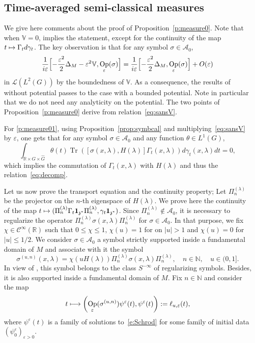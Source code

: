 \documentclass[10pt]{amsart}
\let\mathcal\mathscr
\newcommand\mto{\mathchoice{\longmapsto}{\mapsto}{\mapsto}{\mapsto}}
\newcommand{\bun}{\mathbf{1}}
\DeclareMathOperator{\Op}{Op}
\DeclareMathOperator{\Tr}{Tr}
\theoremstyle{plain}
\theoremstyle{definition}
\let\eps\varepsilon
\def\R{{\mathbb R}}
\def\N{{\mathbb N}}
\def\bbV{{\mathbb V}}
\begin{document}
\subsection{Time-averaged semi-classical measures}
\label{app:semiclas}

We give here comments about the proof of Proposition~\ref{p:measure0}. Note that when $\bbV=0$, \cite[Th.\,2.10(ii)(2)]{FF} implies the statement, except for the continuity of the map $t\mto \Gamma_t d\gamma_t$. The key observation is that for any symbol $\sigma\in\mathcal A_0$,
\begin{equation}\label{eq:sansV}
\frac 1{i\eps} \Bigl[ -\frac{\eps^2}{2}\Delta_M -\eps^2 \bbV, \Op_\eps(\sigma)\Bigr] = \frac 1{i\eps} \Bigl[ -\frac{\eps^2}{2}\Delta_M, \Op_\eps(\sigma)\Bigr] + O(\eps)
\end{equation}
in ${\mathcal L}(L^2(G))$ by the boundedness of $\bbV$. As a consequence, the results of \cite[Th.\,2.10(ii)(2)]{FF} without potential passes to the case with a bounded potential. Note in particular that we do not need any analyticity on the potential.
The two points of Proposition~\ref{p:measure0} derive from relation~\eqref{eq:sansV}.

For \eqref{p:measure01}, using Proposition~\ref{prop:symbcal} and multiplying~\eqref{eq:sansV} by $\eps$, one gets that for any symbol $\sigma\in\mathcal A_0$ and any function $\theta\in L^1(G)$,
\[
\int_{\R\times G \times \hat G} \theta(t) \Tr ([\sigma(x,\lambda),H(\lambda)] \Gamma_t(x,\lambda)) d\gamma_t(x,\lambda) dt=0,
\]
which implies the commutation of $\Gamma_t(x,\lambda)$ with $H(\lambda)$ and thus the relation~\ref{eq:decomp}.

Let us now prove the transport equation and the continuity property;
Let $\Pi_n^{(\lambda)}$ be the projector on the $n$-th eigenspace of $H(\lambda)$.
We prove here the continuity of the map $t\mto (\Pi_n^{(\lambda)}\Gamma_t \bun_{\mathfrak z^*}\Pi_n^{(\lambda)},\gamma_t \bun_{\mathfrak z^*})$. Since $\Pi_n^{(\lambda)}\notin{\mathcal A}_0$, it is necessary to regularize the operator $\Pi_n^{(\lambda)} \sigma(x,\lambda)\Pi_n^{(\lambda)}$ for $\sigma\in\mathcal{A}_0$.
In that purpose, we fix $\chi\in{\mathcal C}^\infty(\R)$ such that $0\leq \chi\leq 1$, $\chi(u)=1$ for on $|u|>1$ and $\chi(u)=0$ for $|u|\leq 1/2$. We consider $\sigma\in {{\mathcal A}_0}$ a symbol strictly supported inside a fundamental domain of $M$ and associate with it the symbol
\[
\sigma^{(u,n)}(x,\lambda)= \chi(uH(\lambda)) \Pi_n^{(\lambda)} \sigma(x,\lambda)\Pi_n^{(\lambda)},\quad n\in\N,\quad u\in (0,1].
\]
In view of \cite[Cor.\,3.9]{FF}, this symbol belongs to the class $S^{-\infty}$ of regularizing symbols. Besides, it is also supported inside a fundamental domain of $M$.
Fix $n\in\N$ and consider the map
\[
t\mto \left(\Op_\eps(\sigma^{(u,n)}) \psi^\eps(t),\psi^\eps(t)\right):=\ell_{u,\eps}(t),
\]
where $\psi^\eps(t)$ is a family of solutions to~\eqref{e:Schrod} for some family of initial data $(\psi^\eps_0)_{\eps>0}$.
\end{document}
